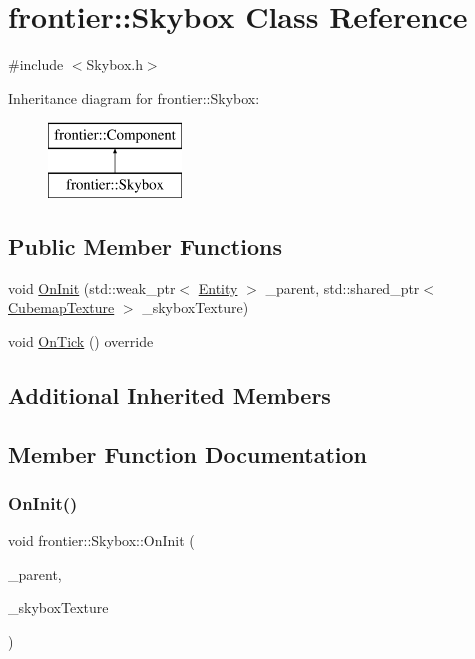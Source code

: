 \hypertarget{classfrontier_1_1_skybox}{}\section{frontier\+:\+:Skybox Class Reference}
\label{classfrontier_1_1_skybox}


{\ttfamily \#include $<$Skybox.\+h$>$}

Inheritance diagram for frontier\+:\+:Skybox\+:\begin{figure}[H]
\begin{center}
\leavevmode
\includegraphics[height=2.000000cm]{classfrontier_1_1_skybox}
\end{center}
\end{figure}
\subsection*{Public Member Functions}
\begin{DoxyCompactItemize}
\item 
void \hyperlink{classfrontier_1_1_skybox_a02a06c87053a2efd6893c0b07465f3c2}{On\+Init} (std\+::weak\+\_\+ptr$<$ \hyperlink{classfrontier_1_1_entity}{Entity} $>$ \+\_\+parent, std\+::shared\+\_\+ptr$<$ \hyperlink{classfrontier_1_1_cubemap_texture}{Cubemap\+Texture} $>$ \+\_\+skybox\+Texture)
\item 
void \hyperlink{classfrontier_1_1_skybox_a38b2ec1a28314c901f4388745d8f0471}{On\+Tick} () override
\end{DoxyCompactItemize}
\subsection*{Additional Inherited Members}


\subsection{Member Function Documentation}
\mbox{\label{classfrontier_1_1_skybox_a02a06c87053a2efd6893c0b07465f3c2}} 
\subsubsection{\texorpdfstring{On\+Init()}{OnInit()}}
{\footnotesize\ttfamily void frontier\+::\+Skybox\+::\+On\+Init (\begin{DoxyParamCaption}\item[{std\+::weak\+\_\+ptr$<$ \hyperlink{classfrontier_1_1_entity}{Entity} $>$}]{\+\_\+parent,  }\item[{std\+::shared\+\_\+ptr$<$ \hyperlink{classfrontier_1_1_cubemap_texture}{Cubemap\+Texture} $>$}]{\+\_\+skybox\+Texture }\end{DoxyParamCaption})}

